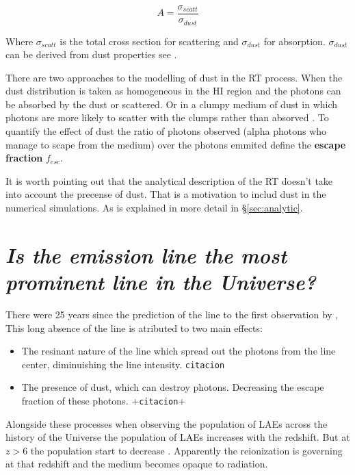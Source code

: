 \begin{equation}
A = \dfrac{\sigma_{scatt}}{\sigma_{dust}}
\end{equation}

Where $\sigma_{scatt}$ is the total cross section for scattering 
and $\sigma_{dust}$ for absorption. $\sigma_{dust}$ can be derived from 
dust properties see \citep{Laursen09}. 

There are two approaches to the modelling of dust in the \ly RT process.
When the dust distribution is taken as homogeneous in the HI region and 
the \ly photons can be absorbed by the dust or scattered. Or in a clumpy
medium of dust in which \ly photons are more likely to scatter with the 
clumps rather than absorved \citep{Laursen13}. To quantify the effect of 
dust the ratio
of \ly photons observed (\ly alpha photons who manage to scape from the medium) 
over the \ly photons emmited  define the {\bf{escape fraction}} $f_{esc}$. 

It is worth pointing out that the analytical
description of the \ly RT doesn't take into account the precense of
dust. That is a motivation to includ dust in the numerical simulations.
As is explained in more detail in \S \ref{sec:analytic}.  





\section{\emph{Is the \ly emission line the most prominent line in the Universe?}}

There were 25 years since the prediction of the \ly line to the first observation by \citep{DjorgovskiThompson92}, 
This long absence of the \ly line is atributed to two main effects:

\begin{itemize}

\item The resinant nature of the line which spread out the photons from the line center, diminuishing the line 
intensity. \verb+citacion+

\item The presence of dust, which can destroy \ly photons. Decreasing the escape fraction of these photons. +\verb+citacion++

\end{itemize}

Alongside these processes when observing the population of LAEs across
the history of the Universe  the population of LAEs increases 
with the redshift. But at $z>6$ the  
population start to decrease \citep{Schenker12}. Apparently 
the reionization  is governing at that redshift and the medium 
becomes opaque to \ly radiation.   



